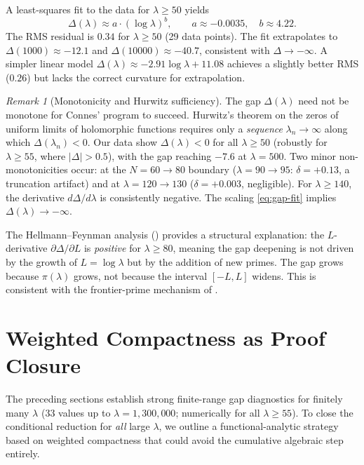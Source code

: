 \documentclass[12pt,a4paper]{article}
\theoremstyle{definition}
\theoremstyle{remark}
\newtheorem{remark}[theorem]{Remark}
\begin{document}
A least-squares fit to the data for $\lambda \geq 50$ yields
\begin{equation}
\label{eq:gap-fit}
\Delta(\lambda) \approx a \cdot (\log\lambda)^b, \qquad a \approx -0.0035,\quad b \approx 4.22.
\end{equation}
The RMS residual is $0.34$ for $\lambda \geq 50$ (29 data points). The fit extrapolates to $\Delta(1000) \approx -12.1$ and $\Delta(10000) \approx -40.7$, consistent with $\Delta \to -\infty$.
A simpler linear model $\Delta(\lambda) \approx -2.91 \log\lambda + 11.08$ achieves a slightly better RMS ($0.26$) but lacks the correct curvature for extrapolation.

\begin{remark}[Monotonicity and Hurwitz sufficiency]
\label{rem:hurwitz}
The gap $\Delta(\lambda)$ need not be monotone for Connes' program to succeed. Hurwitz's theorem on the zeros of uniform limits of holomorphic functions requires only a \emph{sequence} $\lambda_n \to \infty$ along which $\Delta(\lambda_n) < 0$. Our data show $\Delta(\lambda) < 0$ for all $\lambda \geq 50$ (robustly for $\lambda \geq 55$, where $|\Delta| > 0.5$), with the gap reaching $-7.6$ at $\lambda = 500$. Two minor non-monotonicities occur: at the $N = 60 \to 80$ boundary ($\lambda = 90 \to 95$: $\delta = +0.13$, a truncation artifact) and at $\lambda = 120 \to 130$ ($\delta = +0.003$, negligible). For $\lambda \geq 140$, the derivative $d\Delta/d\lambda$ is consistently negative. The scaling \eqref{eq:gap-fit} implies $\Delta(\lambda) \to -\infty$.

The Hellmann--Feynman analysis () provides a structural explanation: the $L$-derivative $\partial\Delta/\partial L$ is \emph{positive} for $\lambda \geq 80$, meaning the gap deepening is not driven by the growth of $L = \log\lambda$ but by the addition of new primes. The gap grows because $\pi(\lambda)$ grows, not because the interval $[-L, L]$ widens. This is consistent with the frontier-prime mechanism of .
\end{remark}


\section{Weighted Compactness as Proof Closure}
\label{sec:weighted-compactness}

The preceding sections establish strong finite-range gap diagnostics for finitely many $\lambda$ ($33$ values up to $\lambda = 1{,}300{,}000$; numerically for all $\lambda \geq 55$). To close the conditional reduction for \emph{all} large $\lambda$, we outline a functional-analytic strategy based on weighted compactness that could avoid the cumulative algebraic step entirely.
\end{document}
